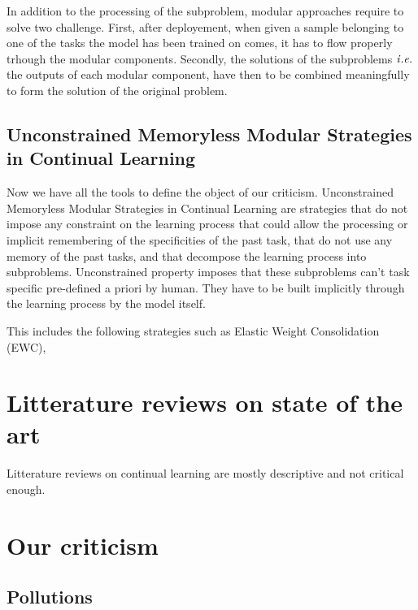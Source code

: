 \documentclass[twocolumn]{article}
\begin{document}
\vspace{1mm}
\noindent
In addition to the processing of the subproblem, modular approaches require to solve two challenge. First, after deployement, when given a sample belonging to one of the tasks the model has been trained on comes, it has to flow properly trhough the modular components. Secondly, the solutions of the subproblems $\it{i.e.}$ the outputs of each modular component, have then to be combined meaningfully to form the solution of the original problem.



\subsection{Unconstrained Memoryless Modular Strategies in Continual Learning}

Now we have all the tools to define the object of our criticism. Unconstrained Memoryless Modular Strategies in Continual Learning are strategies that do not impose any constraint on the learning process that could allow the processing or implicit remembering of the specificities of the past task, that do not use any memory of the past tasks, and that decompose the learning process into subproblems. Unconstrained property imposes that these subproblems can't task specific pre-defined a priori by human. They have to be built implicitly through the learning process by the model itself.

\vspace{1mm}
\noindent
This includes the following strategies such as Elastic Weight Consolidation (EWC), 


\section{Litterature reviews on state of the art}



Litterature reviews on continual learning are mostly descriptive and not critical enough.



\section{Our criticism}



\subsection{Pollutions}
\end{document}
